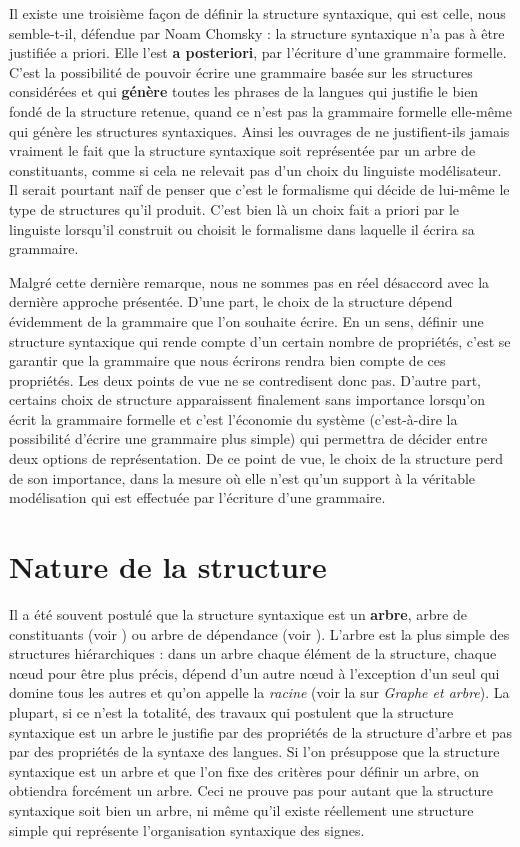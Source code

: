 {    Il existe une troisième façon de définir la structure syntaxique, qui est celle, nous semble-t-il, défendue par Noam Chomsky : la structure syntaxique n’a pas à être justifiée a priori. Elle l’est \textbf{a posteriori}, par l’écriture d’une grammaire formelle. C’est la possibilité de pouvoir écrire une grammaire basée sur les structures considérées et qui \textbf{génère} toutes les phrases de la langues qui justifie le bien fondé de la structure retenue, quand ce n’est pas la grammaire formelle elle-même qui génère les structures syntaxiques. Ainsi les ouvrages de  ne justifient-ils jamais vraiment le fait que la structure syntaxique soit représentée par un arbre de constituants, comme si cela ne relevait pas d’un choix du linguiste modélisateur. Il serait pourtant naïf de penser que c’est le formalisme qui décide de lui-même le type de structures qu’il produit. C’est bien là un choix fait a priori par le linguiste lorsqu’il construit ou choisit le formalisme dans laquelle il écrira sa grammaire.

    Malgré cette dernière remarque, nous ne sommes pas en réel désaccord avec la dernière approche présentée. D’une part, le choix de la structure dépend évidemment de la grammaire que l’on souhaite écrire. En un sens, définir une structure syntaxique qui rende compte d’un certain nombre de propriétés, c’est se garantir que la grammaire que nous écrirons rendra bien compte de ces propriétés. Les deux points de vue ne se contredisent donc pas. D’autre part, certains choix de structure apparaissent finalement sans importance lorsqu’on écrit la grammaire formelle et c’est l’économie du système (c’est-à-dire la possibilité d’écrire une grammaire plus simple) qui permettra de décider entre deux options de représentation. De ce point de vue, le choix de la structure perd de son importance, dans la mesure où elle n’est qu’un support à la véritable modélisation qui est effectuée par l’écriture d’une grammaire.
}
\section{Nature de la structure}\label{sec:3.2.4}

Il a été souvent postulé que la structure syntaxique est un \textbf{arbre}, arbre de constituants (voir ) ou arbre de dépendance (voir ). L’arbre est la plus simple des structures hiérarchiques : dans un arbre chaque élément de la structure, chaque nœud pour être plus précis, dépend d’un autre nœud à l’exception d’un seul qui domine tous les autres et qu’on appelle la \textit{racine} (voir la  sur \textit{Graphe et arbre}). La plupart, si ce n’est la totalité, des travaux qui postulent que la structure syntaxique est un arbre le justifie par des propriétés de la structure d’arbre et pas par des propriétés de la syntaxe des langues. Si l’on présuppose que la structure syntaxique est un arbre et que l’on fixe des critères pour définir un arbre, on obtiendra forcément un arbre. Ceci ne prouve pas pour autant que la structure syntaxique soit bien un arbre, ni même qu’il existe réellement une structure simple qui représente l’organisation syntaxique des signes.

